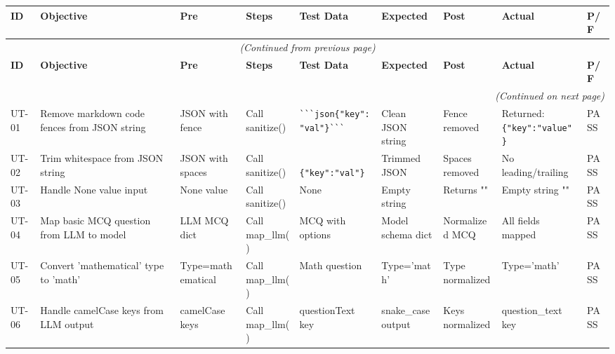 \documentclass{article}
\begin{document}
\begin{longtable}{|p{0.8cm}|p{4cm}|p{2cm}|p{2cm}|p{2.5cm}|p{2cm}|p{2cm}|p{2.5cm}|p{0.8cm}|}
\hline
\rowcolor{gray!30}
\textbf{ID} & \textbf{Objective} & \textbf{Pre} & \textbf{Steps} & \textbf{Test Data} & \textbf{Expected} & \textbf{Post} & \textbf{Actual} & \textbf{P/F} \\
\hline
\endfirsthead

\multicolumn{9}{c}{\textit{(Continued from previous page)}} \\
\hline
\rowcolor{gray!30}
\textbf{ID} & \textbf{Objective} & \textbf{Pre} & \textbf{Steps} & \textbf{Test Data} & \textbf{Expected} & \textbf{Post} & \textbf{Actual} & \textbf{P/F} \\
\hline
\endhead

\hline
\multicolumn{9}{r}{\textit{(Continued on next page)}} \\
\endfoot

\hline
\endlastfoot

UT-01 & Remove markdown code fences from JSON string & JSON with fence & Call sanitize() & \verb|```json{"key":"val"}```| & Clean JSON string & Fence removed & Returned: \verb|{"key":"value"}| & \cellcolor{green!30} PASS \\
\hline

UT-02 & Trim whitespace from JSON string & JSON with spaces & Call sanitize() & \verb|  {"key":"val"}  | & Trimmed JSON & Spaces removed & No leading/trailing & \cellcolor{green!30} PASS \\
\hline

UT-03 & Handle None value input & None value & Call sanitize() & None & Empty string & Returns "" & Empty string "" & \cellcolor{green!30} PASS \\
\hline

UT-04 & Map basic MCQ question from LLM to model & LLM MCQ dict & Call map\_llm() & MCQ with options & Model schema dict & Normalized MCQ & All fields mapped & \cellcolor{green!30} PASS \\
\hline

UT-05 & Convert 'mathematical' type to 'math' & Type=mathematical & Call map\_llm() & Math question & Type='math' & Type normalized & Type='math' & \cellcolor{green!30} PASS \\
\hline

UT-06 & Handle camelCase keys from LLM output & camelCase keys & Call map\_llm() & questionText key & snake\_case output & Keys normalized & question\_text key & \cellcolor{green!30} PASS \\
\hline


\end{longtable}
\end{document}

